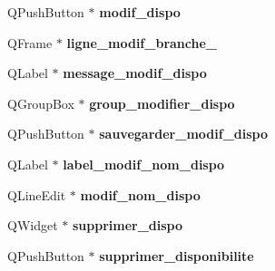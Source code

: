 \begin{DoxyCompactItemize}
\item 
\hypertarget{class_ui___administration_a1b03e330c90c498d762f83473aa55e69}{Q\+Push\+Button $\ast$ {\bfseries modif\+\_\+dispo}}\label{class_ui___administration_a1b03e330c90c498d762f83473aa55e69}

\item 
\hypertarget{class_ui___administration_a276e858d8b91cbd734976bfd56a58cd2}{Q\+Frame $\ast$ {\bfseries ligne\+\_\+modif\+\_\+branche\+\_}}\label{class_ui___administration_a276e858d8b91cbd734976bfd56a58cd2}

\item 
\hypertarget{class_ui___administration_a7e69ab3f7d435c7593f118f61d02e91f}{Q\+Label $\ast$ {\bfseries message\+\_\+modif\+\_\+dispo}}\label{class_ui___administration_a7e69ab3f7d435c7593f118f61d02e91f}

\item 
\hypertarget{class_ui___administration_a38f23abaf0a1896b7fc85d34777c403b}{Q\+Group\+Box $\ast$ {\bfseries group\+\_\+modifier\+\_\+dispo}}\label{class_ui___administration_a38f23abaf0a1896b7fc85d34777c403b}

\item 
\hypertarget{class_ui___administration_ae0172e8fd60362af8f97254fc62cfcdd}{Q\+Push\+Button $\ast$ {\bfseries sauvegarder\+\_\+modif\+\_\+dispo}}\label{class_ui___administration_ae0172e8fd60362af8f97254fc62cfcdd}

\item 
\hypertarget{class_ui___administration_a3dc7442902832913cf31c70f4137b965}{Q\+Label $\ast$ {\bfseries label\+\_\+modif\+\_\+nom\+\_\+dispo}}\label{class_ui___administration_a3dc7442902832913cf31c70f4137b965}

\item 
\hypertarget{class_ui___administration_a90bd9ed39fe2b60faf7b3219c9e4aa47}{Q\+Line\+Edit $\ast$ {\bfseries modif\+\_\+nom\+\_\+dispo}}\label{class_ui___administration_a90bd9ed39fe2b60faf7b3219c9e4aa47}

\item 
\hypertarget{class_ui___administration_a890c0732446f644e6ea9f4430ccb252d}{Q\+Widget $\ast$ {\bfseries supprimer\+\_\+dispo}}\label{class_ui___administration_a890c0732446f644e6ea9f4430ccb252d}

\item 
\hypertarget{class_ui___administration_aad94154da715734785c9a126b32221be}{Q\+Push\+Button $\ast$ {\bfseries supprimer\+\_\+disponibilite}}\label{class_ui___administration_aad94154da715734785c9a126b32221be}


\end{DoxyCompactItemize}

